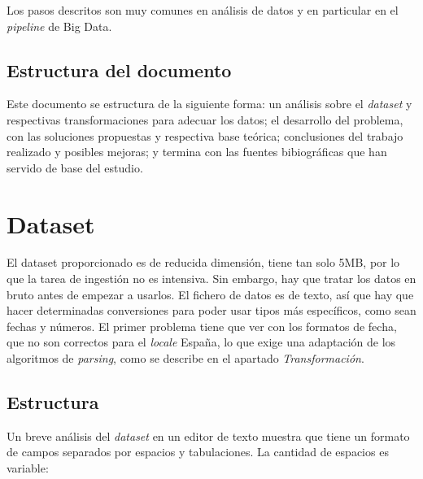 \documentclass[11pt,spanish,listoffigures,listoftables]{tfgetsinf}
\begin{document}
Los pasos descritos son muy comunes en análisis de datos y en particular en el {\em pipeline} de Big Data.

\section{Estructura del documento}

Este documento se estructura de la siguiente forma: un análisis sobre el {\em dataset} y respectivas transformaciones para adecuar los datos; el desarrollo del problema, con las soluciones propuestas y respectiva base teórica; conclusiones del trabajo realizado y posibles mejoras; y termina con las fuentes bibiográficas que han servido de base del estudio.




\chapter{Dataset}
El dataset proporcionado es de reducida dimensión, tiene tan solo 5MB, por lo que la tarea de ingestión no es intensiva. Sin embargo, hay que tratar los datos en bruto antes de empezar a usarlos. El fichero de datos es de texto, así que hay que hacer determinadas conversiones para poder usar tipos más específicos, como sean fechas y números. El primer problema tiene que ver con los formatos de fecha, que no son correctos para el {\em locale} España, lo que exige una adaptación de los algoritmos de {\em parsing}, como se describe en el apartado {\em Transformación}.

\section{Estructura}
Un breve análisis del {\em dataset} en un editor de texto muestra que tiene un formato de campos separados por espacios y tabulaciones. La cantidad de espacios es variable:
\end{document}
